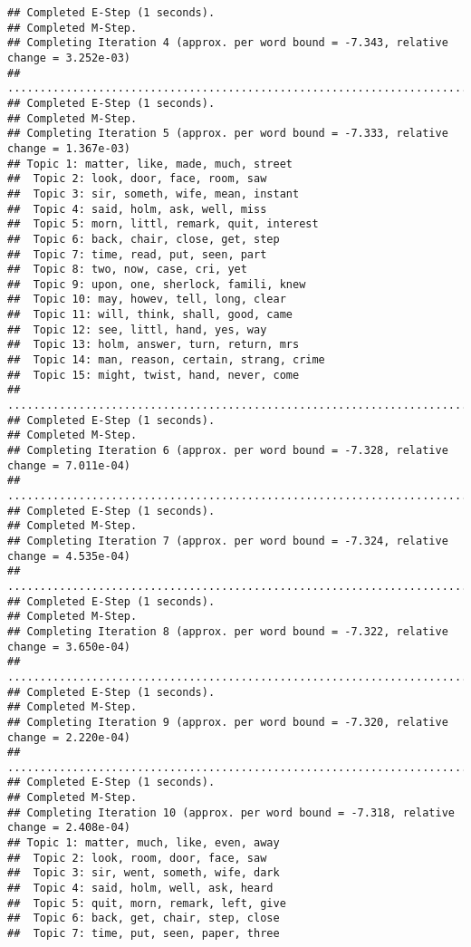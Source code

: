 \documentclass[
]{book}
\begin{document}
\begin{verbatim}
## Completed E-Step (1 seconds). 
## Completed M-Step. 
## Completing Iteration 4 (approx. per word bound = -7.343, relative change = 3.252e-03) 
## ....................................................................................................
## Completed E-Step (1 seconds). 
## Completed M-Step. 
## Completing Iteration 5 (approx. per word bound = -7.333, relative change = 1.367e-03) 
## Topic 1: matter, like, made, much, street 
##  Topic 2: look, door, face, room, saw 
##  Topic 3: sir, someth, wife, mean, instant 
##  Topic 4: said, holm, ask, well, miss 
##  Topic 5: morn, littl, remark, quit, interest 
##  Topic 6: back, chair, close, get, step 
##  Topic 7: time, read, put, seen, part 
##  Topic 8: two, now, case, cri, yet 
##  Topic 9: upon, one, sherlock, famili, knew 
##  Topic 10: may, howev, tell, long, clear 
##  Topic 11: will, think, shall, good, came 
##  Topic 12: see, littl, hand, yes, way 
##  Topic 13: holm, answer, turn, return, mrs 
##  Topic 14: man, reason, certain, strang, crime 
##  Topic 15: might, twist, hand, never, come 
## ....................................................................................................
## Completed E-Step (1 seconds). 
## Completed M-Step. 
## Completing Iteration 6 (approx. per word bound = -7.328, relative change = 7.011e-04) 
## ....................................................................................................
## Completed E-Step (1 seconds). 
## Completed M-Step. 
## Completing Iteration 7 (approx. per word bound = -7.324, relative change = 4.535e-04) 
## ....................................................................................................
## Completed E-Step (1 seconds). 
## Completed M-Step. 
## Completing Iteration 8 (approx. per word bound = -7.322, relative change = 3.650e-04) 
## ....................................................................................................
## Completed E-Step (1 seconds). 
## Completed M-Step. 
## Completing Iteration 9 (approx. per word bound = -7.320, relative change = 2.220e-04) 
## ....................................................................................................
## Completed E-Step (1 seconds). 
## Completed M-Step. 
## Completing Iteration 10 (approx. per word bound = -7.318, relative change = 2.408e-04) 
## Topic 1: matter, much, like, even, away 
##  Topic 2: look, room, door, face, saw 
##  Topic 3: sir, went, someth, wife, dark 
##  Topic 4: said, holm, well, ask, heard 
##  Topic 5: quit, morn, remark, left, give 
##  Topic 6: back, get, chair, step, close 
##  Topic 7: time, put, seen, paper, three 

\end{verbatim}
\end{document}
